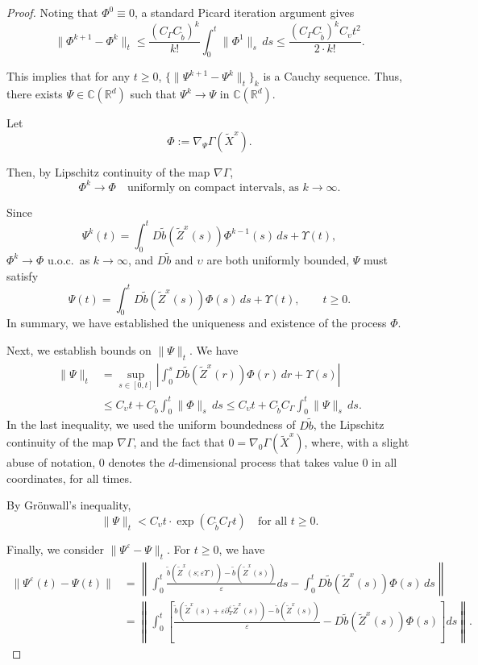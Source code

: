 \documentclass[11pt]{article}
\theoremstyle{definition}
\theoremstyle{plain}
\newcommand{\C}{\mathbb{C}}
\newcommand{\tb}{\tilde{b}}
\begin{document}
\begin{appendices}
\begin{proof}
Noting that $\Phi^0 \equiv 0$, a standard Picard iteration argument gives
\[
\| \Phi^{k+1} - \Phi^k \|_t \le \frac{(C_\Gamma C_{\tb})^k}{k!} \int_0^t \| \Phi^1 \|_s\,ds \le \frac{(C_\Gamma C_{\tb})^k C_\upsilon t^2}{2\cdot k!}.
\]

This implies that for any $t \ge 0$,  \( \{ \| \Psi^{k+1} - \Psi^k \|_t \}_k \) is a Cauchy sequence.  
Thus, there exists \( \Psi \in \C(\mathbb{R}^d) \) such that \( \Psi^k \to \Psi \) in \( \C(\mathbb{R}^d) \).


Let
\[
\Phi := \nabla_{\Psi} \Gamma(\tilde{X}^x).
\]

Then, by Lipschitz continuity of the map \( \nabla \Gamma \),
\[
\Phi^k \to \Phi \quad \text{uniformly on compact intervals, as } k \to \infty.
\]

Since
\[
\Psi^k(t) = \int_0^t D\tb(\tilde{Z}^x(s)) \Phi^{k-1}(s)\,ds + \Upsilon(t),
\]
\( \Phi^k \to \Phi \) u.o.c.\ as \( k \to \infty \), and $D\tb$ and $\upsilon$ are both uniformly bounded, 
\( \Psi \) must satisfy
\[
\Psi(t) = \int_0^t D\tb(\tilde{Z}^x(s)) \Phi(s)\,ds + \Upsilon(t), \qquad t \ge 0.
\]
In summary, we have established the uniqueness and existence of the process $\Phi$.

Next, we establish bounds on $\|\Psi\|_t$. We have
\begin{align*}
\| \Psi \|_t &= \sup_{s \in [0,t]} \left| \int_0^s D\tb(\tilde{Z}^x(r)) \Phi(r)\,dr + \Upsilon(s) \right| \\
& \le C_\upsilon t + C_{\tb} \int_0^t \| \Phi \|_s\,ds
\le C_\upsilon t + C_{\tb} C_\Gamma \int_0^t \| \Psi \|_s\,ds.
\end{align*}
In the last inequality, we used the uniform boundedness of $D\tb$, the Lipschitz continuity of the map \( \nabla \Gamma \), and the fact that
$0 = \nabla_0 \Gamma(\tilde{X}^x)$, where, with a slight abuse of notation, $0$ denotes the $d$-dimensional process that takes value $0$ in all coordinates, for all times.


By Grönwall’s inequality,
\[
\| {\Psi} \|_t < C_\upsilon t \cdot \exp \left(C_{\tb} C_\Gamma t\right) \quad \text{for all } t \ge 0. 
\]

Finally, we consider $\| \Psi^\varepsilon - \Psi \|_t$. For $t \geq 0$, we have 
\begin{align*}
\| \Psi^\varepsilon (t) - \Psi (t) \| &= \left\| \int_0^t \frac{\tb(\tilde{Z}^x(s; \varepsilon \Upsilon)) - \tb(\tilde{Z}^x(s))}{\varepsilon} ds - \int_0^t D\tb(\tilde{Z}^x(s)) \Phi(s)\,ds \right\| \\
&= \left\| \int_0^t \left[ \frac{\tb(\tilde{Z}^x(s) + \varepsilon \partial_\Upsilon^\varepsilon \tilde{Z}^x(s)) - \tb(\tilde{Z}^x(s))}{\varepsilon} - D\tb(\tilde{Z}^x(s)) \Phi(s) \right] ds \right\|.
\end{align*}


\end{proof}
\end{appendices}
\end{document}
